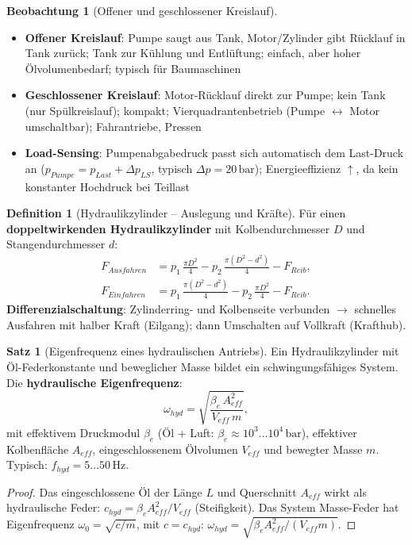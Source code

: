 ﻿\documentclass[a4paper,12pt]{report}
\theoremstyle{definition}
\newtheorem{definition}{Definition}
\newtheorem{satz}{Satz}
\newtheorem{beobachtung}{Beobachtung}
\begin{document}
\begin{beobachtung}[Offener und geschlossener Kreislauf]
\begin{itemize}
    \item[-] \textbf{Offener Kreislauf}: Pumpe saugt aus Tank, Motor/Zylinder
          gibt Rücklauf in Tank zurück; Tank zur Kühlung und Entlüftung;
          einfach, aber hoher Ölvolumenbedarf; typisch für Baumaschinen
    \item[-] \textbf{Geschlossener Kreislauf}: Motor-Rücklauf direkt zur Pumpe;
          kein Tank (nur Spülkreislauf); kompakt; Vierquadrantenbetrieb
          (Pumpe $\leftrightarrow$ Motor umschaltbar); Fahrantriebe, Pressen
    \item[-] \textbf{Load-Sensing}: Pumpenabgabedruck passt sich automatisch
          dem Last-Druck an ($p_{Pumpe} = p_{Last} + \Delta p_{LS}$, typisch $\Delta p = 20\,\mathrm{bar}$);
          Energieeffizienz $\uparrow$, da kein konstanter Hochdruck bei Teillast
\end{itemize}
\end{beobachtung}

\begin{definition}[Hydraulikzylinder -- Auslegung und Kräfte]
Für einen \textbf{doppeltwirkenden Hydraulikzylinder} mit Kolbendurchmesser $D$
und Stangendurchmesser $d$:
\begin{align*}
  F_{Ausfahren} &= p_1\,\frac{\pi D^2}{4} - p_2\,\frac{\pi(D^2-d^2)}{4} - F_{Reib}, \\
  F_{Einfahren} &= p_1\,\frac{\pi(D^2-d^2)}{4} - p_2\,\frac{\pi D^2}{4} - F_{Reib}.
\end{align*}
\textbf{Differenzialschaltung}: Zylinderring- und Kolbenseite verbunden $\to$
schnelles Ausfahren mit halber Kraft (Eilgang); dann Umschalten auf
Vollkraft (Krafthub).
\end{definition}

\begin{satz}[Eigenfrequenz eines hydraulischen Antriebs]
Ein Hydraulikzylinder mit Öl-Federkonstante und beweglicher Masse
bildet ein schwingungsfähiges System. Die \textbf{hydraulische Eigenfrequenz}:
\[
  \omega_{hyd} = \sqrt{\frac{\beta_e\,A_{eff}^2}{V_{eff}\,m}},
\]
mit effektivem Druckmodul $\beta_e$ (Öl + Luft: $\beta_e \approx 10^3\ldots10^4\,\mathrm{bar}$),
effektiver Kolbenfläche $A_{eff}$, eingeschlossenem Ölvolumen $V_{eff}$
und bewegter Masse $m$. Typisch: $f_{hyd} = 5\ldots50\,\mathrm{Hz}$.
\end{satz}
\begin{proof}
Das eingeschlossene Öl der Länge $L$ und Querschnitt $A_{eff}$ wirkt
als hydraulische Feder: $c_{hyd} = \beta_e A_{eff}^2 / V_{eff}$ (Steifigkeit).
Das System Masse-Feder hat Eigenfrequenz $\omega_0 = \sqrt{c/m}$,
mit $c = c_{hyd}$: $\omega_{hyd} = \sqrt{\beta_e A_{eff}^2/(V_{eff}m)}$.
\end{proof}
\end{document}
